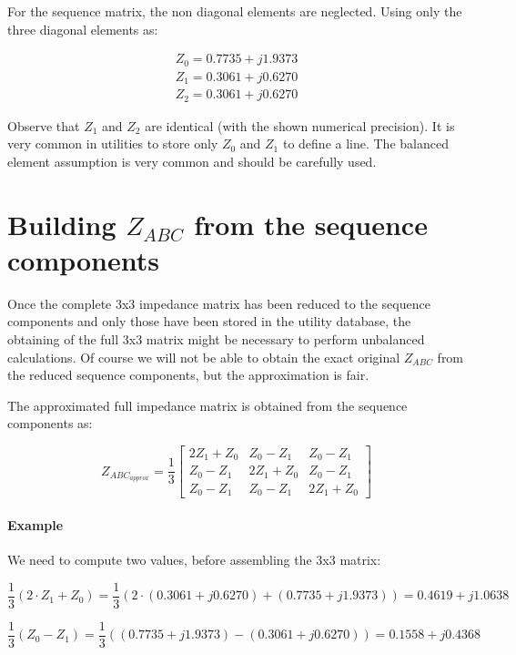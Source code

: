 \documentclass[a4paper,twoside,fleqn]{tufte-book}
\begin{document}
For the sequence matrix, the non diagonal elements are neglected. Using only the three diagonal elements as:

$$
\begin{array}{c}
Z_0 = 0.7735 + j 1.9373 \\
Z_1 = 0.3061 + j 0.6270 \\
Z_2 = 0.3061  +  j 0.6270
\end{array}
$$

Observe that $Z_1$ and $Z_2$ are identical (with the shown numerical precision). It is very common in utilities to store only $Z_0$ and $Z_1$ to define a line. The balanced element assumption is very common and should be carefully used.

\section{Building $Z_{ABC}$ from the sequence components}

Once the complete 3x3 impedance matrix has been reduced to the sequence components and only those have been stored in the utility database, the obtaining of the full 3x3 matrix might be necessary to perform unbalanced calculations. Of course we will not be able to obtain the exact original $Z_{ABC}$ from the reduced sequence components, but the approximation is fair.

The approximated full impedance matrix is obtained from the sequence components as:

\begin{equation}
Z_{ABC_{approx}} = \frac{1}{3}\left[ \begin{array}{ccc}
2Z_1 + Z_0 & Z_0 - Z_1 & Z_0 - Z_1 \\
Z_0 - Z_1 & 2Z_1 + Z_0 & Z_0 - Z_1 \\ 
Z_0 - Z_1 & Z_0 - Z_1 & 2Z_1 + Z_0
\end{array} \right]
\end{equation}

\paragraph{Example}

We need to compute two values, before assembling the 3x3 matrix:

$$
\frac{1}{3}(2 \cdot Z_1 + Z_0) = \frac{1}{3} (2\cdot(0.3061 + j 0.6270) + (0.7735 + j 1.9373)) = 0.4619 + j1.0638
$$

$$
\frac{1}{3} (Z_0 - Z_1) = \frac{1}{3}((0.7735 + j 1.9373) - (0.3061 + j 0.6270)) = 0.1558 + j0.4368
$$
\end{document}
